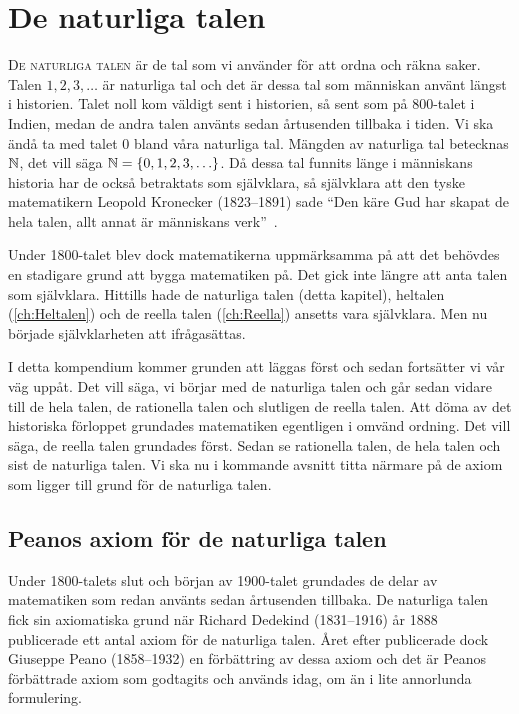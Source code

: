 \chapter{De naturliga talen}\label{DeNaturligaTalen}

\lettrine{D}{e naturliga talen} är de tal som vi använder för att ordna
och räkna saker.
Talen \(1,2,3,\ldots\) är naturliga tal och det är dessa tal som människan
använt längst i historien.
Talet noll kom väldigt sent i historien, så sent som på 800-talet i Indien,
medan de andra talen använts sedan årtusenden tillbaka i tiden.
Vi ska ändå ta med talet \(0\) bland våra naturliga tal.
Mängden av naturliga tal betecknas \(\mathbb{N}\), det vill säga
\(\mathbb{N}=\{0,1,2,3,\ldots\}\).
Då dessa tal funnits länge i människans historia har de också betraktats som
självklara, så självklara att den tyske matematikern Leopold Kronecker 
(1823--1891) sade \enquote{Den käre Gud har skapat de hela talen, allt annat är 
  människans verk}~\cite[egen översättning]{Kline1990mtf3}.

Under 1800-talet blev dock matematikerna uppmärksamma på att det behövdes en
stadigare grund att bygga matematiken på.
Det gick inte längre att anta talen som självklara.
Hittills hade de naturliga talen (detta kapitel), heltalen 
(\cref{ch:Heltalen}) och de reella talen (\cref{ch:Reella}) ansetts 
vara självklara.
Men nu började självklarheten att ifrågasättas.

I detta kompendium kommer grunden att läggas först och sedan fortsätter vi
vår väg uppåt.
Det vill säga, vi börjar med de naturliga talen och går sedan vidare till de
hela talen, de rationella talen och slutligen de reella talen.
Att döma av det historiska förloppet grundades matematiken egentligen i omvänd
ordning.
Det vill säga, de reella talen grundades först.
Sedan se rationella talen, de hela talen och sist de naturliga talen.
Vi ska nu i kommande avsnitt titta närmare på de axiom som ligger till grund
för de naturliga talen.


\section{Peanos axiom för de naturliga talen}
Under 1800-talets slut och början av 1900-talet grundades de delar
av matematiken som redan använts sedan årtusenden tillbaka.
De naturliga talen fick sin axiomatiska grund när Richard Dedekind (1831--1916)
år 1888 publicerade ett antal axiom för de naturliga talen.
Året efter publicerade dock Giuseppe Peano (1858--1932) en förbättring av dessa
axiom och det är Peanos förbättrade axiom som godtagits och används idag,
om än i lite annorlunda formulering.

